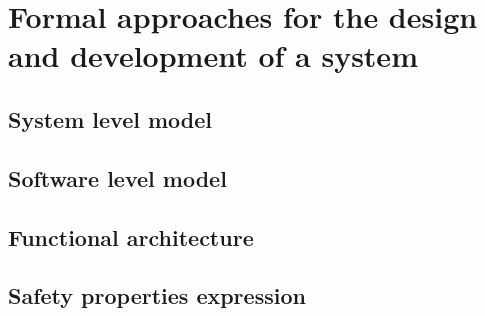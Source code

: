 


\section{Formal approaches for the design and development of a system}


\begin{comment}
This section will describe how formal methods are involved in the design of critical system.
\end{comment}



\subsection{System level model}

\subsection{Software level model}

\subsection{Functional architecture}

\subsection{Safety properties expression}


